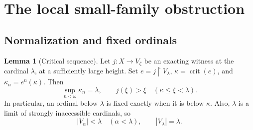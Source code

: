 \documentclass[11pt,letterpaper]{article}
\theoremstyle{definition}
\newtheorem{lemma}[definition]{Lemma}
\numberwithin{equation}{section}
\newcommand{\crit}{\operatorname{crit}}
\newcommand{\restr}{\mathbin{\upharpoonright}}
\begin{document}
\section{The local small-family obstruction}\label{sec:local}

\subsection{Normalization and fixed ordinals}

\begin{lemma}[Critical sequence]\label{lem:critical}
Let $j:X\to V_\zeta$ be an exacting witness at the cardinal $\lambda$, at a sufficiently large height. Set $e=j\restr V_\lambda$, $\kappa=\crit(e)$, and $\kappa_n=e^n(\kappa)$. Then
\[
 \sup_{n<\omega}\kappa_n=\lambda,
 \qquad j(\xi)>\xi\quad(\kappa\le\xi<\lambda).
\]
In particular, an ordinal below $\lambda$ is fixed exactly when it is below $\kappa$. Also, $\lambda$ is a limit of strongly inaccessible cardinals, so
\begin{equation}\label{eq:rankbounds}
 |V_\alpha|<\lambda\quad(\alpha<\lambda),\qquad |V_\lambda|=\lambda.
\end{equation}
\end{lemma}
\end{document}
